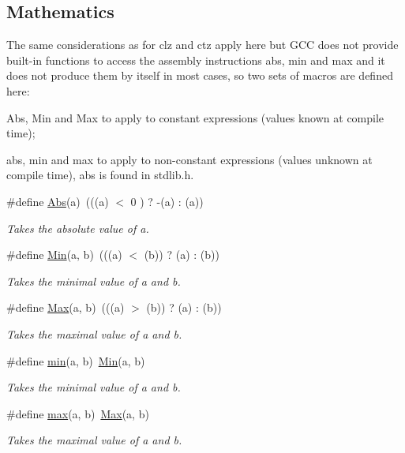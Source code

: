 \subsection*{Mathematics}
\label{_amgrp540b21ecdb276f5087ee585cedd6d5d0}%
The same considerations as for clz and ctz apply here but G\+CC does not provide built-\/in functions to access the assembly instructions abs, min and max and it does not produce them by itself in most cases, so two sets of macros are defined here\+:
\begin{DoxyItemize}
\item Abs, Min and Max to apply to constant expressions (values known at compile time);
\item abs, min and max to apply to non-\/constant expressions (values unknown at compile time), abs is found in stdlib.\+h. 
\end{DoxyItemize}\begin{DoxyCompactItemize}
\item 
\#define \mbox{\hyperlink{group__group__sam0__utils_gae56b0282c58a65969c092e1eeeedd6f5}{Abs}}(a)~(((a) $<$  0 ) ? -\/(a) \+: (a))
\begin{DoxyCompactList}\small\item\em Takes the absolute value of {\itshape a}. \end{DoxyCompactList}\item 
\#define \mbox{\hyperlink{group__group__sam0__utils_ga9e04209162ea72f9985338596262b657}{Min}}(a,  b)~(((a) $<$ (b)) ?  (a) \+: (b))
\begin{DoxyCompactList}\small\item\em Takes the minimal value of {\itshape a} and {\itshape b}. \end{DoxyCompactList}\item 
\#define \mbox{\hyperlink{group__group__sam0__utils_ga4886a8f966a69949cefc46a6a3468006}{Max}}(a,  b)~(((a) $>$ (b)) ?  (a) \+: (b))
\begin{DoxyCompactList}\small\item\em Takes the maximal value of {\itshape a} and {\itshape b}. \end{DoxyCompactList}\item 
\#define \mbox{\hyperlink{group__group__sam0__utils_gac6afabdc09a49a433ee19d8a9486056d}{min}}(a,  b)~\mbox{\hyperlink{group__group__sam0__utils_ga9e04209162ea72f9985338596262b657}{Min}}(a, b)
\begin{DoxyCompactList}\small\item\em Takes the minimal value of {\itshape a} and {\itshape b}. \end{DoxyCompactList}\item 
\#define \mbox{\hyperlink{group__group__sam0__utils_gaffe776513b24d84b39af8ab0930fef7f}{max}}(a,  b)~\mbox{\hyperlink{group__group__sam0__utils_ga4886a8f966a69949cefc46a6a3468006}{Max}}(a, b)
\begin{DoxyCompactList}\small\item\em Takes the maximal value of {\itshape a} and {\itshape b}. \end{DoxyCompactList}\end{DoxyCompactItemize}
